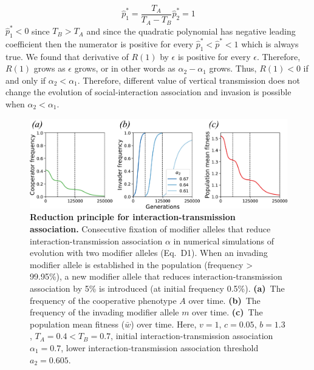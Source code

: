 \documentclass[12pt]{extarticle}
\begin{document}
\begin{equation} \label{eq:numerator_roots}
  \hat{p}^*_1 = \frac{T_A}{T_A-T_B} \hat{p}^*_2 = 1
\end{equation}
$\hat{p}^*_1 < 0$ since $T_B>T_A$ and since the quadratic polynomial has negative leading coefficient then the numerator is positive for every $\hat{p}^*_1<\hat{p}^*<1$ which is always true.
We found that derivative of $R(1)$ by $\epsilon$ is positive for every $\epsilon$. 
Therefore, $R(1)$ grows as $\epsilon$ grows, or in other words as $\alpha_2-\alpha_1$ grows.
Thus, $R(1)<0$ if and only if $\alpha_2<\alpha_1$. Therefore, different value of vertical transmission does not change the evolution of social-interaction association and invasion is possible when $\alpha_2<\alpha_1$.



\begin{figure}[h]
  \centering
  \includegraphics[width=1\textwidth]{../PRSB_figures/fig_s1.pdf}
  \caption{
  \textbf{Reduction principle for interaction-transmission association.} 
  Consecutive fixation of modifier alleles that reduce interaction-transmission association $\alpha$ in numerical simulations of evolution with two modifier alleles (Eq.~D1).
  When an invading modifier allele is established in the population (frequency > 99.95\%), a new modifier allele that reduces interaction-transmission association by 5\% is introduced (at initial frequency 0.5\%).
  \textbf{(a)}~The frequency of the cooperative phenotype $A$ over time.
  \textbf{(b)}~The frequency of the invading modifier allele $m$ over time. 
  \textbf{(c)}~The population mean fitness ($\bar{w}$) over time.
  Here, $v=1$, $c = 0.05$, $b=1.3$, $T_A=0.4<T_B=0.7$, initial interaction-transmission association $\alpha_1=0.7$, lower interaction-transmission association threshold $a_2=0.605$.  
  }
  \label{fig:invasion}
\end{figure}
\newpage
\end{document}
